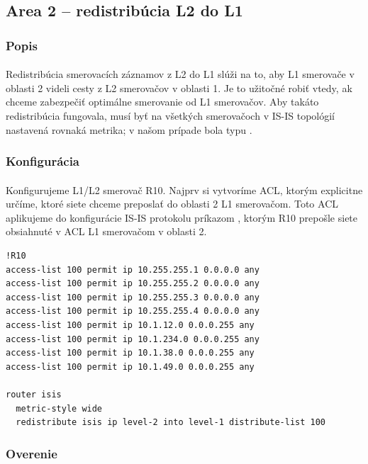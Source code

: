 \documentclass[12pt,twoside,a4paper]{report}
\begin{document}
\subsection{Area 2 – redistribúcia L2 do L1}
\subsubsection{Popis}
\paragraph{}
Redistribúcia smerovacích záznamov z L2 do L1 slúži na to, aby L1 smerovače v oblasti 2 videli cesty z L2 smerovačov v oblasti 1. Je to užitočné  robiť vtedy, ak chceme zabezpečiť optimálne smerovanie od L1 smerovačov. Aby takáto redistribúcia fungovala, musí byť na všetkých smerovačoch v IS-IS topológií nastavená rovnaká metrika; v našom prípade bola typu .

\subsubsection{Konfigurácia}
\paragraph{}
Konfigurujeme L1/L2 smerovač R10. Najprv si vytvoríme ACL, ktorým explicitne určíme, ktoré siete chceme preposlať do oblasti 2 L1 smerovačom. Toto ACL aplikujeme do konfigurácie IS-IS protokolu príkazom , ktorým R10 prepošle siete obsiahnuté v ACL L1 smerovačom v oblasti 2.

\noindent
{\selectfont
\begin{small}
\begin{verbatim}
!R10
access-list 100 permit ip 10.255.255.1 0.0.0.0 any
access-list 100 permit ip 10.255.255.2 0.0.0.0 any
access-list 100 permit ip 10.255.255.3 0.0.0.0 any
access-list 100 permit ip 10.255.255.4 0.0.0.0 any
access-list 100 permit ip 10.1.12.0 0.0.0.255 any
access-list 100 permit ip 10.1.234.0 0.0.0.255 any
access-list 100 permit ip 10.1.38.0 0.0.0.255 any
access-list 100 permit ip 10.1.49.0 0.0.0.255 any

router isis
  metric-style wide
  redistribute isis ip level-2 into level-1 distribute-list 100
\end{verbatim}
\end{small}
}

\subsubsection{Overenie}
\end{document}

